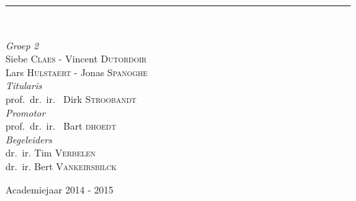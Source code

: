 \documentclass[a4paper,11.5pt]{report}
\newcommand{\HRule}{\rule{\linewidth}{0.5mm}}
\begin{document}
\begin{titlepage}
\begin{center}
\begin{figure}[H]
\end{figure}


\HRule \\[1.5cm]

\begin{minipage}{1\textwidth}
\begin{center} \large
\emph{Groep 2}\\
Siebe \textsc{Claes} 
 - Vincent \textsc{Dutordoir}\\
Lars \textsc{Hulstaert}
 - Jonas \textsc{Spanoghe}\\[0.2cm]
\emph{Titularis}\\
prof.~dr.~ir.~ Dirk \textsc{Stroobandt}\\[0.2cm]
\emph{Promotor}\\
prof.~dr.~ir.~ Bart \textsc{dhoedt}\\[0.2cm]
\emph{Begeleiders}\\
dr.~ir. Tim \textsc{Verbelen}\\
dr.~ir. Bert \textsc{Vankeirsbilck}\\

\end{center}
\end{minipage}

\vfill

{\large Academiejaar 2014 - 2015}
\end{center}

\end{titlepage}

\tableofcontents







\end{document}
